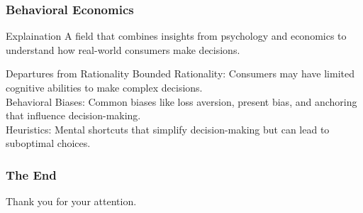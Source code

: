 \documentclass{beamer}
\begin{document}
\begin{frame}
    \frametitle{Behavioral Economics}
    \begin{block}{Explaination}
         A field that combines insights from psychology and economics to understand how real-world consumers make decisions.
    \end{block}
    \begin{block}{Departures from Rationality}
Bounded Rationality: Consumers may have limited cognitive abilities to make complex decisions.\\
Behavioral Biases: Common biases like loss aversion, present bias, and anchoring that influence decision-making.\\
Heuristics: Mental shortcuts that simplify decision-making but can lead to suboptimal choices.
    \end{block}
\end{frame}



\begin{frame}
    \frametitle{The End}
    Thank you for your attention.
\end{frame}
\end{document}
